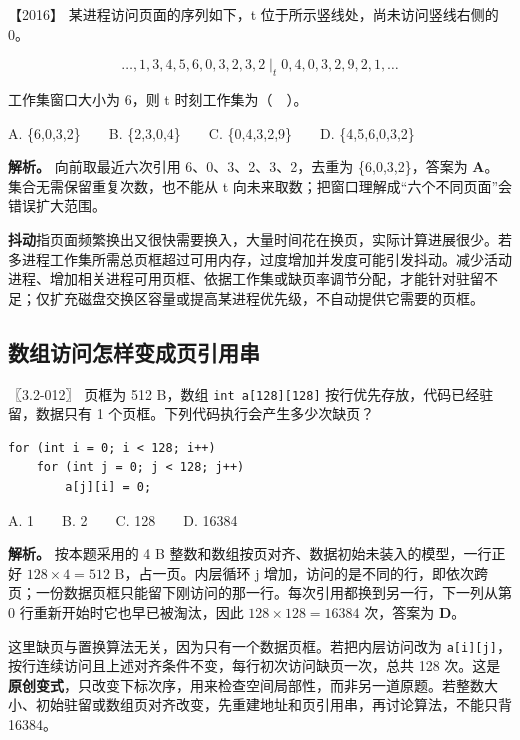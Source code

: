 \noindent{}【2016】 某进程访问页面的序列如下，t 位于所示竖线处，尚未访问竖线右侧的 0。

\[\ldots,1,3,4,5,6,0,3,2,3,2\;\big|_{t}\;0,4,0,3,2,9,2,1,\ldots\]

工作集窗口大小为 6，则 t 时刻工作集为（　）。

A. \{6,0,3,2\}　　B. \{2,3,0,4\}　　C. \{0,4,3,2,9\}　　D. \{4,5,6,0,3,2\}


\textbf{解析。} 向前取最近六次引用 6、0、3、2、3、2，去重为 \{6,0,3,2\}，答案为 \textbf{A}。集合无需保留重复次数，也不能从 t 向未来取数；把窗口理解成``六个不同页面''会错误扩大范围。

\textbf{抖动}指页面频繁换出又很快需要换入，大量时间花在换页，实际计算进展很少。若多进程工作集所需总页框超过可用内存，过度增加并发度可能引发抖动。减少活动进程、增加相关进程可用页框、依据工作集或缺页率调节分配，才能针对驻留不足；仅扩充磁盘交换区容量或提高某进程优先级，不自动提供它需要的页框。

\subsection{数组访问怎样变成页引用串}\label{os-c05-h259}

\noindent{}〖3.2-012〗 页框为 512 B，数组 \texttt{int\ a{[}128{]}{[}128{]}} 按行优先存放，代码已经驻留，数据只有 1 个页框。下列代码执行会产生多少次缺页？

\par\medskip\noindent
\begin{minipage}{\linewidth}
\begin{verbatim}
for (int i = 0; i < 128; i++)
    for (int j = 0; j < 128; j++)
        a[j][i] = 0;
\end{verbatim}
\end{minipage}\par\medskip

A. 1　　B. 2　　C. 128　　D. 16384


\textbf{解析。} 按本题采用的 4 B 整数和数组按页对齐、数据初始未装入的模型，一行正好 \(128\times4=512\) B，占一页。内层循环 j 增加，访问的是不同的行，即依次跨页；一份数据页框只能留下刚访问的那一行。每次引用都换到另一行，下一列从第 0 行重新开始时它也早已被淘汰，因此 \(128\times128=16384\) 次，答案为 \textbf{D}。

这里缺页与置换算法无关，因为只有一个数据页框。若把内层访问改为 \texttt{a{[}i{]}{[}j{]}}，按行连续访问且上述对齐条件不变，每行初次访问缺页一次，总共 128 次。这是\textbf{原创变式}，只改变下标次序，用来检查空间局部性，而非另一道原题。若整数大小、初始驻留或数组页对齐改变，先重建地址和页引用串，再讨论算法，不能只背 16384。

